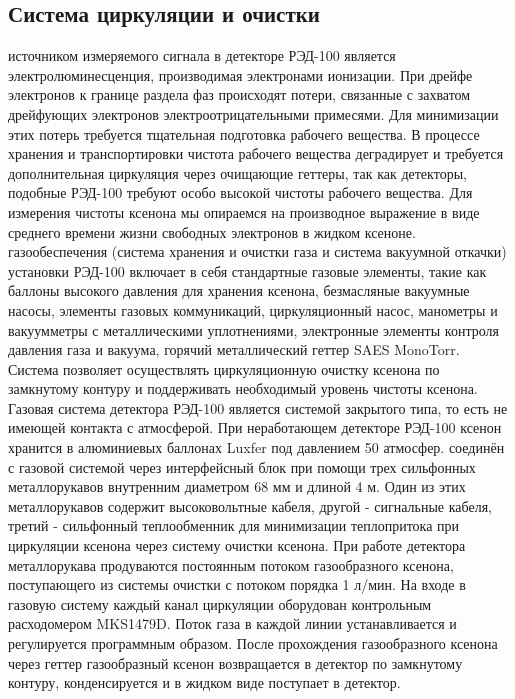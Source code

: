 \subsection{Система циркуляции и очистки}
\label{subsect2_1_2}
 источником измеряемого сигнала в детекторе РЭД-100 является электролюминесценция, производимая электронами ионизации. При дрейфе электронов к границе раздела фаз происходят потери, связанные с захватом дрейфующих электронов электроотрицательными примесями. Для минимизации этих потерь требуется тщательная подготовка рабочего вещества. В процессе хранения и транспортировки чистота рабочего вещества деградирует и требуется дополнительная циркуляция через очищающие геттеры, так как детекторы, подобные РЭД-100 требуют особо высокой чистоты рабочего вещества. Для измерения чистоты ксенона мы опираемся на производное выражение в виде среднего времени жизни свободных электронов в жидком ксеноне. 
 газообеспечения (система хранения и очистки газа и система вакуумной откачки) установки РЭД-100 включает в себя стандартные газовые элементы, такие как баллоны высокого давления для хранения ксенона, безмасляные вакуумные насосы, элементы газовых коммуникаций, циркуляционный насос, манометры и вакуумметры с металлическими уплотнениями, электронные элементы контроля давления газа и вакуума, горячий металлический геттер SAES MonoTorr. Система позволяет осуществлять циркуляционную очистку ксенона по замкнутому контуру и поддерживать необходимый уровень чистоты ксенона. Газовая система детектора РЭД-100 является системой закрытого типа, то есть не имеющей контакта с атмосферой. При неработающем детекторе РЭД-100 ксенон хранится в алюминиевых баллонах Luxfer под давлением 50 атмосфер. 
 соединён с газовой системой через интерфейсный блок при помощи трех сильфонных металлорукавов внутренним диаметром 68 мм и длиной 4 м. Один из этих металлорукавов содержит высоковольтные кабеля, другой - сигнальные кабеля, третий - сильфонный теплообменник для минимизации теплопритока при циркуляции ксенона через систему очистки ксенона. При работе детектора металлорукава продуваются постоянным потоком газообразного ксенона, поступающего из системы очистки с потоком порядка 1 л/мин. На входе в газовую систему каждый канал циркуляции оборудован контрольным расходомером MKS1479D.  Поток газа в каждой линии устанавливается и регулируется программным образом. После прохождения газообразного ксенона через геттер газообразный ксенон возвращается в детектор по замкнутому контуру, конденсируется и в жидком виде поступает в детектор. 

